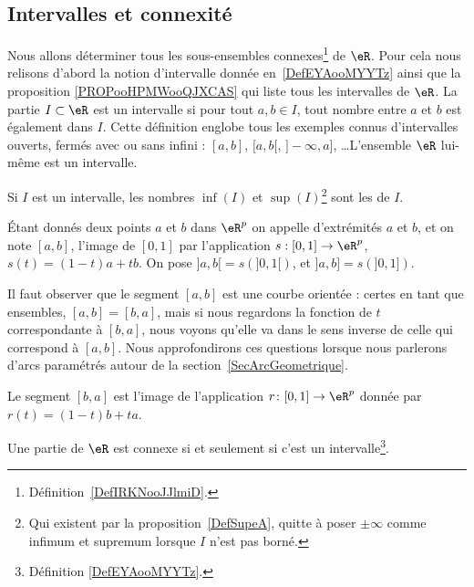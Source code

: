 \subsection{Intervalles et connexité}

Nous allons déterminer tous les sous-ensembles connexes\footnote{Définition~\ref{DefIRKNooJJlmiD}.} de \( \eR\). Pour cela nous relisons d'abord la notion d'intervalle donnée en~\ref{DefEYAooMYYTz} ainsi que la proposition \ref{PROPooHPMWooQJXCAS} qui liste tous les intervalles de \( \eR\). La partie \( I\subset \eR\) est un intervalle si pour tout \( a,b\in I\), tout nombre entre \( a\) et \( b\) est également dans \( I\). Cette définition englobe tous les exemples connus d'intervalles ouverts, fermés avec ou sans infini : \( [a,b]\), \( [a,b[\), \( ]-\infty,a]\), \ldots L'ensemble \( \eR\) lui-même est un intervalle.

Si \( I\) est un intervalle, les nombres \( \inf(I)\) et \( \sup(I)\)\footnote{Qui existent par la proposition~\ref{DefSupeA}, quitte à poser \( \pm\infty\) comme infimum et supremum lorsque \( I\) n'est pas borné.} sont les  de \( I\).

\begin{definition}      \label{DefLISOooDHLQrl}
	Étant donnés deux points \( a\) et \( b\) dans \( \eR^p\) on appelle  d'extrémités \( a\) et \( b\), et on note \( [a,b]\), l'image de \( [0,1]\) par l'application \( s: [0,1]\to \eR^p\), \( s(t)= (1-t)a+tb\).  On pose \( ]a,b[=s\left(]0,1[\right)\), et  \( ]a,b]=s\left(]0,1]\right)\).
\end{definition}
Il faut observer que le segment \( [a,b]\) est une courbe orientée : certes en tant que ensembles, \( [a,b]=[b,a]\), mais si nous regardons la fonction de \( t\) correspondante à \( [b,a]\), nous voyons qu'elle va dans le sens inverse de celle qui correspond à \( [a,b]\). Nous approfondirons ces questions lorsque nous parlerons d'arcs paramétrés autour de la section~\ref{SecArcGeometrique}.

Le segment \( [b,a]\) est l'image de l'application \( r\colon [0,1]\to \eR^p\) donnée par \( r(t)=(1-t)b+ta\).

\begin{proposition} \label{PropInterssiConn}
	Une partie de \( \eR\) est connexe si et seulement si c'est un intervalle\footnote{Définition \ref{DefEYAooMYYTz}.}.
\end{proposition}

